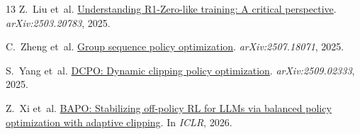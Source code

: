 \documentclass{article}
\begin{document}
\begin{thebibliography}{13}
Z.~Liu et~al.
\newblock \href{https://arxiv.org/abs/2503.20783}{Understanding R1-Zero-like training: A critical perspective}.
\newblock \emph{arXiv:2503.20783}, 2025.

C.~Zheng et~al.
\newblock \href{https://arxiv.org/abs/2507.18071}{Group sequence policy optimization}.
\newblock \emph{arXiv:2507.18071}, 2025.

S.~Yang et~al.
\newblock \href{https://arxiv.org/abs/2509.02333}{DCPO: Dynamic clipping policy optimization}.
\newblock \emph{arXiv:2509.02333}, 2025.

Z.~Xi et~al.
\newblock \href{https://arxiv.org/abs/2510.18927}{BAPO: Stabilizing off-policy RL for LLMs via balanced policy optimization with adaptive clipping}.
\newblock In \emph{ICLR}, 2026.

\end{thebibliography}
\end{document}
